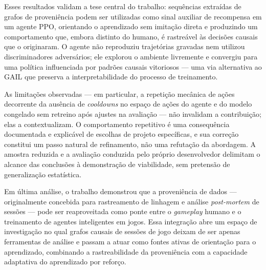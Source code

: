 Esses resultados validam a tese central do trabalho: sequências extraídas de
grafos de proveniência podem ser utilizadas como sinal auxiliar de recompensa
em um agente PPO, orientando o aprendizado sem imitação direta e produzindo
um comportamento que, embora distinto do humano, é rastreável às decisões
causais que o originaram. O agente não reproduziu trajetórias gravadas nem
utilizou discriminadores adversários; ele explorou o ambiente livremente e
convergiu para uma política influenciada por padrões causais vitoriosos ---
uma via alternativa ao GAIL \cite{ho2016gail} que preserva a interpretabilidade
do processo de treinamento.

As limitações observadas --- em particular, a repetição mecânica de ações
decorrente da ausência de \textit{cooldowns} no espaço de ações do agente e
do modelo congelado sem retreino após ajustes na avaliação --- não invalidam
a contribuição; elas a contextualizam. O comportamento repetitivo é uma
consequência documentada e explicável de escolhas de projeto específicas, e
sua correção constitui um passo natural de refinamento, não uma refutação da
abordagem. A amostra reduzida e a avaliação conduzida pelo próprio
desenvolvedor delimitam o alcance das conclusões à demonstração de viabilidade,
sem pretensão de generalização estatística.

Em última análise, o trabalho demonstrou que a proveniência de dados ---
originalmente concebida para rastreamento de linhagem e análise
\textit{post-mortem} de sessões --- pode ser reaproveitada como ponte entre
o \textit{gameplay} humano e o treinamento de agentes inteligentes em jogos.
Essa integração abre um espaço de investigação no qual grafos causais de
sessões de jogo deixam de ser apenas ferramentas de análise e passam a atuar
como fontes ativas de orientação para o aprendizado, combinando a
rastreabilidade da proveniência com a capacidade adaptativa do aprendizado
por reforço.
